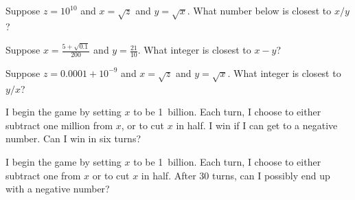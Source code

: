 \documentclass{ximera}
\begin{document}
\begin{problem}
  Suppose $z = 10^{10}$ and $x = \sqrt{z}$ and $y = \sqrt{x}$.  What number below is closest to $x/y$?
  \begin{multipleChoice}
  \end{multipleChoice}
\end{problem}

\begin{problem}
  Suppose $x = \frac{5 + \sqrt{0.1}}{200}$ and $y = \frac{21}{10}$.  What integer is closest to $x - y$?
  \begin{multipleChoice}
  \end{multipleChoice}
\end{problem}

\begin{problem}
  Suppose $z = 0.0001 + 10^{-9}$ and $x = \sqrt{z}$ and $y = \sqrt{x}$.  What integer is closest to $y/x$?
  \begin{multipleChoice}
  \end{multipleChoice}
\end{problem}

\begin{problem}
  I begin the game by setting $x$ to be 1~billion.  Each turn, I
  choose to either subtract one million from $x$, or to cut $x$ in
  half.  I win if I can get to a negative number.  Can I win in six
  turns?
  \begin{multipleChoice}
  \end{multipleChoice}
\end{problem}

\begin{problem}
  I begin the game by setting $x$ to be 1~billion.  Each turn, I
  choose to either subtract one from $x$ or to cut $x$ in half.  After
  30 turns, can I possibly end up with a negative number?
  \begin{multipleChoice}
  \end{multipleChoice}
\end{problem}
\end{document}
